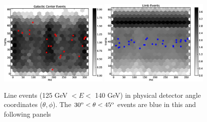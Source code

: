 \documentclass[aps,twocolumn,prd,superscriptaddress,showpacs,nofootinbib,fixfloat]{revtex4}
\newcommand{\degree}{^{\rm o}}
\begin{document}
\begin{figure}
  \centering
  \includegraphics[width=0.48\textwidth]{plots/gc_theta_phi.eps}
  \includegraphics[width=0.48\textwidth]{plots/limb_theta_phi.eps}
  \caption{Line events (125 GeV $< E <$ 140 GeV) in physical detector angle
  coordinates ($\theta, \phi$).  The $30\degree < \theta < 45\degree$ events
  are blue in this and following panels}
  \label{fig:theta-phi}
\end{figure}
\end{document}
